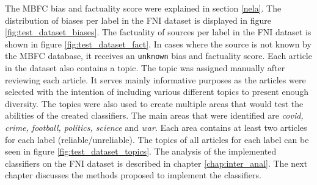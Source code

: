 The MBFC bias and factuality score were explained in section \ref{nela}.
The distribution of biases per label in the FNI dataset is displayed in figure \ref{fig:test_dataset_biases}. The factuality of sources per label in the FNI dataset is shown in figure \ref{fig:test_dataset_fact}.
In cases where the source is not known by the MBFC database, it receives an \texttt{unknown} bias and factuality score. Each article in the dataset also contains a topic. The topic was assigned manually after reviewing each article. It serves mainly informative purposes as the articles were selected with the intention of including various different topics to present enough diversity. The topics were also used to create multiple areas that would test the abilities of the created classifiers. The main areas that were identified are \emph{covid, crime, football, politics, science} and \emph{war}. Each area contains at least two articles for each label (reliable/unreliable). The topics of all articles for each label can be seen in figure \ref{fig:test_dataset_topics}. The analysis of the implemented classifiers on the FNI dataset is described in chapter \ref{chap:inter_anal}. The next chapter discusses the methods proposed to implement the classifiers.

